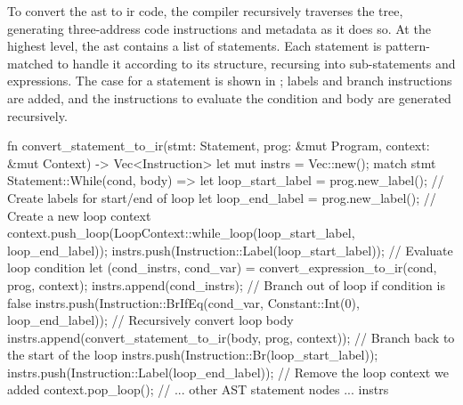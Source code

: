 \documentclass[00-main.tex]{subfiles}
\begin{document}
To convert the \gls{ast} to \gls{ir} code, the compiler recursively traverses the tree, generating three-address code instructions and metadata as it does so.
At the highest level, the \gls{ast} contains a list of statements.
Each statement is pattern-matched to handle it according to its structure, recursing into sub-statements and expressions.
The case for a  statement is shown in ; labels and branch instructions are added, and the instructions to evaluate the condition and body are generated recursively.





\begin{listing}[t]
  \begin{RustListing}
    fn convert_statement_to_ir(stmt: Statement, prog: &mut Program, context: &mut Context)
            -> Vec<Instruction> {
        let mut instrs = Vec::new();
        match stmt {
            Statement::While(cond, body) => {
                let loop_start_label = prog.new_label(); // Create labels for start/end of loop
                let loop_end_label = prog.new_label();
                // Create a new loop context
                context.push_loop(LoopContext::while_loop(loop_start_label, loop_end_label));
                instrs.push(Instruction::Label(loop_start_label));
                // Evaluate loop condition
                let (cond_instrs, cond_var) = convert_expression_to_ir(cond, prog, context);
                instrs.append(cond_instrs);
                // Branch out of loop if condition is false
                instrs.push(Instruction::BrIfEq(cond_var, Constant::Int(0), loop_end_label));
                // Recursively convert loop body
                instrs.append(convert_statement_to_ir(body, prog, context));
                // Branch back to the start of the loop
                instrs.push(Instruction::Br(loop_start_label));
                instrs.push(Instruction::Label(loop_end_label));
                // Remove the loop context we added
                context.pop_loop();
            }
            // ... other AST statement nodes ...
        }
        instrs
    }
  \end{RustListing}
  \caption{\protect{}%
    Generating intermediate code for a  statement. The \gls{ast} is pattern matched to handle each type of statement separately. The other cases are not shown here.
  }
  \label{lst:convert while stmt to IR}
\end{listing}
\end{document}
